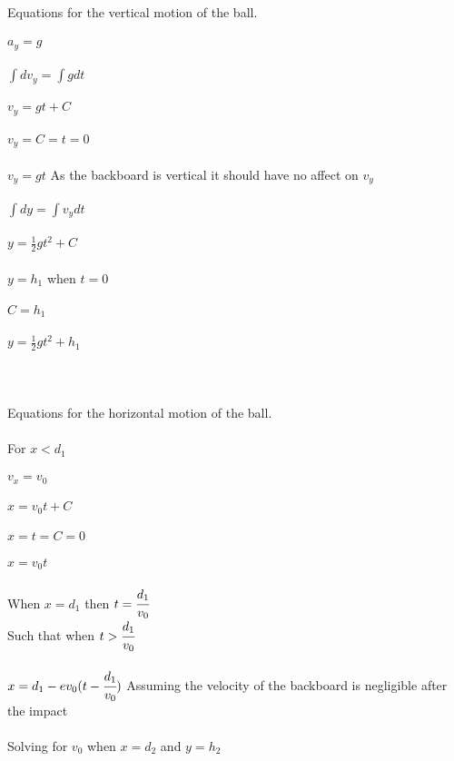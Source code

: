 \documentclass{article}
\begin{document}
\section{}
Equations for the vertical motion of the ball.\\ \\
$a_y = g$\\ \\
$\int dv_y = \int gdt$\\ \\
$v_y = gt + C $\\ \\
$v_y=C=t=0$\\ \\
$v_y = gt$ 
As the backboard is vertical it should have no affect on $v_y$\\ \\
$\int dy = \int v_y dt$\\ \\
$y = \frac{1}{2}gt^2 + C$\\ \\
$y = h_1$ when $t = 0$\\ \\
$C = h_1$\\ \\
$y = \frac{1}{2}gt^2 + h_1$\\ \\
\\ \\
Equations for the horizontal motion of the ball.\\ \\
For $x<d_1$\\ \\
$v_x = v_0$\\ \\
$x = v_0t + C$\\ \\
$x = t = C = 0$\\ \\
$x = v_0t$\\ \\
When $x = d_1$ then $t = \cfrac{d_1}{v_0}$\\ 
Such that when $t > \cfrac{d_1}{v_0}$\\ \\
$x = d_1 - e v_0(t - \cfrac{d_1}{v_0})$ Assuming the velocity of the backboard is negligible after the impact\\ \\
Solving for $v_0$ when $x = d_2$ and $y = h_2$\\ \\
\end{document}
